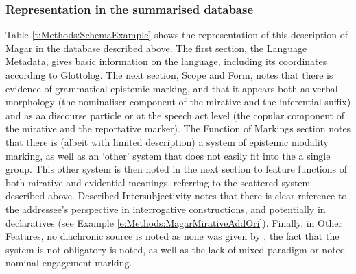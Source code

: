 \subsubsection{Representation in the summarised database}
Table \ref{t:Methods:SchemaExample} shows the representation of this description of Magar in the database described above. The first section, the Language Metadata, gives basic information on the language, including its coordinates according to Glottolog. The next section, Scope and Form, notes that there is evidence of grammatical epistemic marking, and that it appears both as verbal morphology (the nominaliser component of the mirative and the inferential suffix) and as aa discourse particle or at the speech act level (the copular component of the mirative and the reportative marker). The Function of Markings section notes that there is (albeit with limited description) a system of epistemic modality marking, as well as an `other' system that does not easily fit into the a single group. This other system is then noted in the next section to feature functions of both mirative and evidential meanings, referring to the scattered system described above. Described Intersubjectivity notes that there is clear reference to the addressee's perspective in interrogative constructions, and potentially in declaratives (see Example \ref{e:Methods:MagarMirativeAddOri}). Finally, in Other Features, no diachronic source is noted as none was given by , the fact that the system is not obligatory is noted, as well as the lack of mixed paradigm or noted nominal engagement marking.
